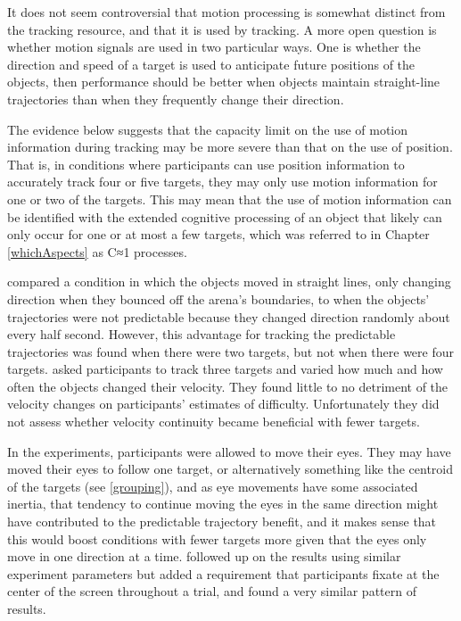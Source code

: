 \documentclass[
]{book}
\begin{document}
It does not seem controversial that motion processing is somewhat distinct from the tracking resource, and that it is used by tracking. A more open question is whether motion signals are used in two particular ways. One is whether the direction and speed of a target is used to anticipate future positions of the objects, then performance should be better when objects maintain straight-line trajectories than when they frequently change their direction.

The evidence below suggests that the capacity limit on the use of motion information during tracking may be more severe than that on the use of position. That is, in conditions where participants can use position information to accurately track four or five targets, they may only use motion information for one or two of the targets. This may mean that the use of motion information can be identified with the extended cognitive processing of an object that likely can only occur for one or at most a few targets, which was referred to in Chapter \ref{whichAspects} as C≈1 processes.

\citet{howeMotionInformationSometimes2012} compared a condition in which the objects moved in straight lines, only changing direction when they bounced off the arena's boundaries, to when the objects' trajectories were not predictable because they changed direction randomly about every half second. However, this advantage for tracking the predictable trajectories was found when there were two targets, but not when there were four targets. \citet{vulExplainingHumanMultiple2010} asked participants to track three targets and varied how much and how often the objects changed their velocity. They found little to no detriment of the velocity changes on participants' estimates of difficulty. Unfortunately they did not assess whether velocity continuity became beneficial with fewer targets.

In the \citet{howeMotionInformationSometimes2012} experiments, participants were allowed to move their eyes. They may have moved their eyes to follow one target, or alternatively something like the centroid of the targets (see \ref{grouping}), and as eye movements have some associated inertia, that tendency to continue moving the eyes in the same direction might have contributed to the predictable trajectory benefit, and it makes sense that this would boost conditions with fewer targets more given that the eyes only move in one direction at a time. \citet{luuExtrapolationOccursMultiple2015} followed up on the \citet{howeMotionInformationSometimes2012} results using similar experiment parameters but added a requirement that participants fixate at the center of the screen throughout a trial, and found a very similar pattern of results.
\end{document}

